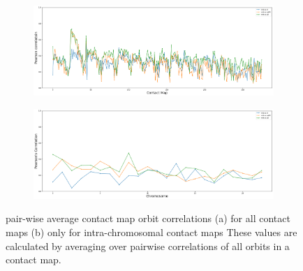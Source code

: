 \documentclass[a4,center,fleqn]{NAR}
\begin{document}
\begin{figure}[t]
    \centering
    \begin{subfigure}[b]{\textwidth}
        \includegraphics[width=\textwidth]{figures/contact_maps_correlations_all.png}
        \caption{}
        \label{fig:contact_maps_correlations_all}
    \end{subfigure}
    \begin{subfigure}[b]{\textwidth}
        \includegraphics[width=\textwidth]{figures/contact_maps_correlations_intra.png}
        \caption{}
        \label{fig:contact_maps_correlations_intra}
    \end{subfigure}
    \caption{pair-wise average contact map orbit correlations
             (a) for all contact maps
             (b) only for intra-chromosomal contact maps
             These values are calculated by averaging over 
             pairwise correlations of all orbits in a 
             contact map.
             }
    \label{fig:contact_maps_correlations}
\end{figure}
\end{document}
